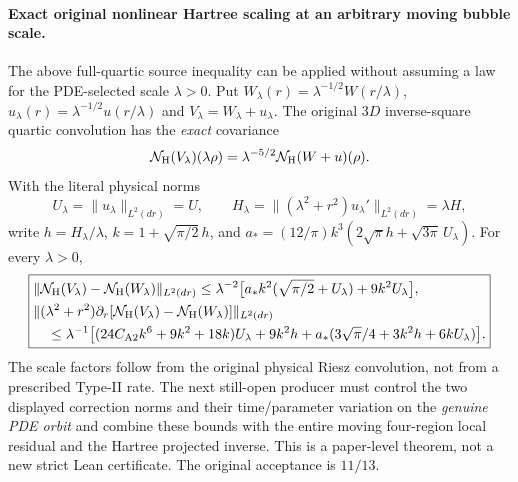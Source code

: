 \documentclass[11pt]{amsart}
\begin{document}
\paragraph{Exact original nonlinear Hartree scaling at an arbitrary moving bubble scale.}
The above full-quartic source inequality can be applied
without assuming a law for the PDE-selected scale
\(\lambda>0\).
Put \(W_\lambda(r)=\lambda^{-1/2}W(r/\lambda)\),
\(u_\lambda(r)=\lambda^{-1/2}u(r/\lambda)\) and
\(V_\lambda=W_\lambda+u_\lambda\).
The original \(3D\) inverse-square quartic convolution has
the \emph{exact} covariance
\[
 \mathcal N_{\rm H}(V_\lambda)(\lambda\rho)
 =\lambda^{-5/2}\mathcal N_{\rm H}(W+u)(\rho).
\]
With the literal physical norms
\[
 U_\lambda=\|u_\lambda\|_{L^2(dr)}=U,\qquad
 H_\lambda=\|(\lambda^2+r^2)u_\lambda'\|_{L^2(dr)}
       =\lambda H,
\]
write \(h=H_\lambda/\lambda\),
\(k=1+\sqrt{\pi/2}\,h\), and
\(a_*=(12/\pi)k^3(2\sqrt\pi h+\sqrt{3\pi}\,U_\lambda)\).
For every \(\lambda>0\),
\[
 \boxed{\begin{aligned}
 &\|\mathcal N_{\rm H}(V_\lambda)
   -\mathcal N_{\rm H}(W_\lambda)\|_{L^2(dr)}
 \le\lambda^{-2}
   \bigl[a_*k^2(\sqrt{\pi/2}+U_\lambda)
        +9k^2U_\lambda\bigr],\\
 &\|(\lambda^2+r^2)\partial_r[
    \mathcal N_{\rm H}(V_\lambda)
   -\mathcal N_{\rm H}(W_\lambda)]\|_{L^2(dr)}\\
 &\quad\le\lambda^{-1}\bigl[
    (24C_{\rm A2}k^6+9k^2+18k)U_\lambda+9k^2h
     +a_*(3\sqrt\pi/4+3k^2h+6kU_\lambda)\bigr].
 \end{aligned}}
\]
The scale factors follow from the original physical
Riesz convolution, not from a prescribed Type-II rate.
The next still-open producer must control the
two displayed correction norms and their time/parameter
variation on the \emph{genuine PDE orbit} and combine
these bounds with the entire moving four-region
local residual and the Hartree projected inverse.
This is a paper-level theorem, not a new strict Lean
certificate. The original acceptance is \(11/13\).
\end{document}
